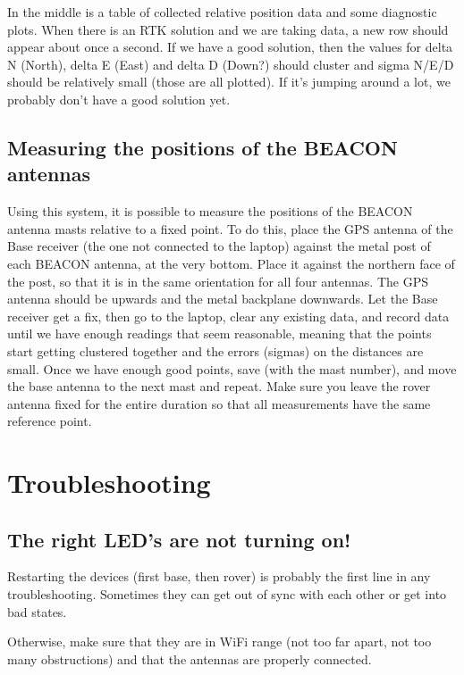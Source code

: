 \documentclass[usletter]{article}
\begin{document}
In the middle is a table of collected relative position data and some diagnostic plots. When there is an RTK solution and we are taking data, a new row should appear about once a second. If we have a good solution, then the values for delta N (North), delta E (East) and delta D (Down?) should cluster and sigma N/E/D should be relatively small (those are all plotted). If it's jumping around a lot, we probably don't have a good solution yet. 

\subsection{Measuring the positions of the BEACON antennas} 

Using this system, it is possible to measure the positions of the BEACON antenna masts relative to a fixed point. To do this, place the GPS antenna of the Base receiver (the one not connected to the laptop) against the metal post of each BEACON antenna, at the very bottom. Place it against the northern face of the post, so that it is in the same orientation for all four antennas. The GPS antenna should be upwards and the metal backplane downwards. Let the Base receiver get a fix, then go to the laptop, clear any existing data, and record data until we have enough readings that seem reasonable, meaning that the points start getting clustered together and the errors (sigmas) on the distances are small. Once we have enough good points, save (with the mast number), and move the base antenna to the next mast and repeat. Make sure you leave the rover antenna fixed for the entire duration so that all measurements have the same reference point. 

\section{Troubleshooting} 

\subsection{The right LED's are not turning on!} 

Restarting the devices (first base, then rover) is probably the first line in any troubleshooting. Sometimes they can get out of sync with each other or get into bad states. 

Otherwise, make sure that they are in WiFi range (not too far apart, not too many obstructions) and that the antennas are properly connected. 
\end{document}
